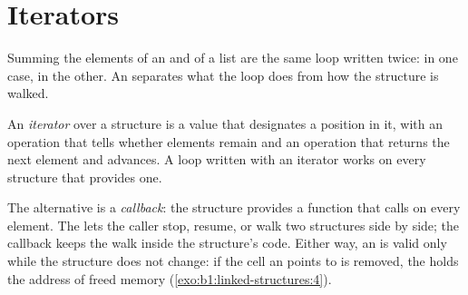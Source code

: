 \label{out:b1:linked-structures:both}

\section{Iterators}\label{sec:b1:linked-structures:iterators}

Summing the elements of an  and of a list are the same loop written twice:  in one
case,  in the other. An  separates what the loop does from how
the structure is walked.

\begin{definition}[Iterator]\label{def:b1:linked-structures:iterator}
An \emph{iterator} over a structure is a value that designates a position in it, with an operation that
tells whether elements remain and an operation that returns the next element and advances. A loop written with an
iterator works on every structure that provides one.
\end{definition}

\label{lst:b1:linked-structures:iter}

\label{out:b1:linked-structures:iter}

The alternative is a \emph{callback}: the structure provides a function  that calls 
on every element. The  lets the caller stop, resume, or walk two structures side by side; the callback keeps the
walk inside the structure's code. Either way, an  is valid only while the structure does not change: if the
cell an  points to is removed, the  holds the address of freed memory (\cref{exo:b1:linked-structures:4}).

